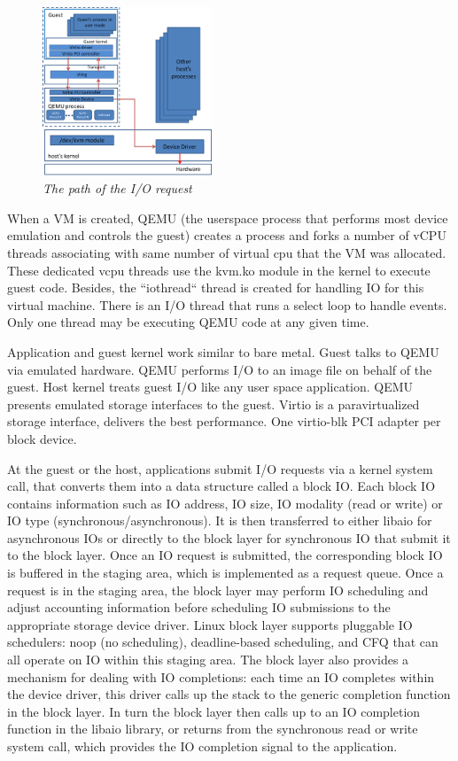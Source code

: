 \documentclass{acmsig}
\begin{document}
  \begin{figure}[htbp]
    \centering
    \includegraphics[width=0.45\textwidth]{figures/iopath.png}
    \caption{\textit{The path of the I/O request }}
    \label{iopath}
  \end{figure}
 
  When a VM is created, QEMU (the userspace process that performs most device emulation and controls the guest) creates a process and forks a number of vCPU threads associating with same number of virtual cpu that the VM was allocated. These dedicated vcpu threads use the kvm.ko module in the kernel to execute guest code. Besides, the ``iothread`` thread is created for handling IO for this virtual machine. There is an I/O thread that runs a select loop to handle events. Only one thread may be executing QEMU code at any given time.

  Application and guest kernel work similar to bare metal. Guest talks to QEMU via emulated hardware. QEMU performs I/O to an image file on behalf of the guest. Host kernel treats guest I/O like any user space application. QEMU presents emulated storage interfaces to the guest. Virtio is a paravirtualized storage interface, delivers the best performance. One virtio-blk PCI adapter per block device.
  
  At the guest or the host, applications submit I/O requests via a kernel system call, that converts them into a data structure called a block IO. Each block IO contains information such as IO address, IO size, IO modality (read or write) or IO type (synchronous/asynchronous). It is then transferred to either libaio for asynchronous IOs or directly to the block layer for synchronous IO that submit it to the block layer. Once an IO request is submitted, the corresponding block IO is buffered in the staging area, which is implemented as a request queue. Once a request is in the staging area, the block layer may perform IO scheduling and adjust accounting information before scheduling IO submissions to the appropriate storage device driver. Linux block layer supports pluggable IO schedulers: noop (no scheduling), deadline-based scheduling, and CFQ that can all operate on IO within this staging area. The block layer also provides a mechanism for dealing with IO completions: each time an IO completes within the device driver, this driver calls up the stack to the generic completion function in the block layer. In turn the block layer then calls up to an IO completion function in the libaio library, or returns from the synchronous read or write system call, which provides the IO completion signal to the application.
  
\end{document}
